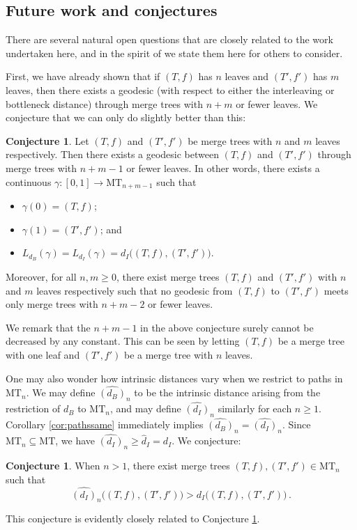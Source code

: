 \documentclass{article}
\theoremstyle{definition}
\newtheorem{conjecture}[theorem]{Conjecture}
\newcommand{\MT}{\mathrm{MT}}
\begin{document}
\subsection{Future work and conjectures}
There are several natural open questions that are closely related to the work undertaken here, and in the spirit of \cite{gasparovic2025intrinsic} we state them here for others to consider.

First, we have already shown that if $(T,f)$ has $n$ leaves and $(T',f')$ has $m$ leaves, then there exists a geodesic (with respect to either the interleaving or bottleneck distance) through merge trees with $n + m$ or fewer leaves. We conjecture that we can only do slightly better than this:

\begin{conjecture}
    \label{conj:optgeo}
    Let $(T,f)$ and $(T',f')$ be merge trees with $n$ and $m$ leaves respectively. Then there exists a geodesic between $(T,f)$ and $(T',f')$ through merge trees with $n + m - 1$ or fewer leaves. In other words, there exists a continuous $\gamma:[0,1] \to \MT_{n + m -1}$ such that
    \begin{itemize}
        \item $\gamma(0) = (T,f)$;
        \item $\gamma(1) = (T',f')$; and
        \item $L_{d_B}(\gamma) = L_{d_I}(\gamma) = d_{I}\big((T,f),(T',f')\big)$.
    \end{itemize}
    Moreover, for all $n,m \geq 0$, there exist merge trees $(T,f)$ and $(T',f')$ with $n$ and $m$ leaves respectively such that no geodesic from $(T,f)$ to $(T',f')$ meets only merge trees with $n + m - 2$ or fewer leaves.
\end{conjecture}

We remark that the $n + m - 1$ in the above conjecture surely cannot be decreased by any constant. This can be seen by letting $(T,f)$ be a merge tree with one leaf and $(T',f')$ be a merge tree with $n$ leaves.

One may also wonder how intrinsic distances vary when we restrict to paths in $\MT_n$. We may define $\widehat{(d_B)}_n$ to be the intrinsic distance arising from the restriction of $d_B$ to $\MT_n$, and may define $\widehat{(d_I)}_n$ similarly for each $n\geq 1$. Corollary \ref{cor:pathssame} immediately implies $\widehat{(d_B)}_n = \widehat{(d_I)}_n$. Since $\MT_n \subseteq \MT$, we have $\widehat{(d_I)}_n \geq \widehat{d}_I = d_I$. We conjecture:
\begin{conjecture}
    When $n >1$, there exist merge trees $(T,f), (T',f')\in \MT_n$ such that
    \begin{equation*}
        \widehat{(d_I)}_n \big((T,f),(T',f')\big) > d_I \big((T,f),(T',f')\big)\,.
    \end{equation*}
\end{conjecture}
This conjecture is evidently closely related to Conjecture \ref{conj:optgeo}.
\end{document}
